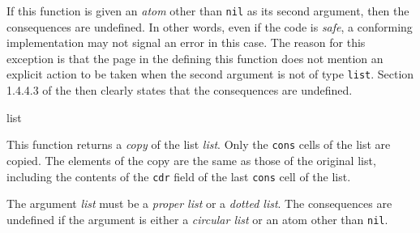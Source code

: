 If this function is given an \emph{atom} other than \texttt{nil} as
its second argument, then the consequences are undefined.  In other
words, even if the code is \emph{safe}, a conforming implementation
may not signal an error in this case.  The reason for this exception
is that the page in the \hs{} defining this function does not mention
an explicit action to be taken when the second argument is not of type
\texttt{list}.  Section 1.4.4.3 of the \hs{} then clearly states that
the consequences are undefined.

 {list}

This function returns a \emph{copy} of the list \textit{list}.  Only
the \texttt{cons} cells of the list are copied.  The elements of the
copy are the same as those of the original list, including the
contents of the \texttt{cdr} field of the last \texttt{cons} cell of
the list. 

The argument \textit{list} must be a \emph{proper list} or a
\emph{dotted list}.  The consequences are undefined if the argument is
either a \emph{circular list} or an atom other than \texttt{nil}. 
